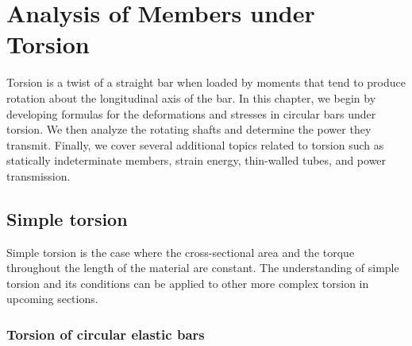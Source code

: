 \documentclass[
10pt,
a4paper,
openany,
svgnames,
]{kaobook} %
\begin{document}
\begin{exercises}
  \begin{figure}[H]
    \centering
    \centering
  \end{figure}

\end{exercises}

\chapter{Analysis of Members under Torsion}

Torsion is a twist of a straight bar when loaded by moments that tend to produce rotation about the longitudinal axis of the bar. In this chapter, we begin by developing formulas for the deformations and stresses in circular bars under torsion. We then analyze the rotating shafts and determine the power they transmit. Finally, we cover several additional topics related to torsion such as statically indeterminate members, strain energy, thin-walled tubes, and power transmission.

\section{Simple torsion}

Simple torsion is the case where the cross-sectional area and the torque throughout the length of the material are constant. The understanding of simple torsion and its conditions can be applied to other more complex torsion in upcoming sections.

\subsection{Torsion of circular elastic bars}
\end{document}
